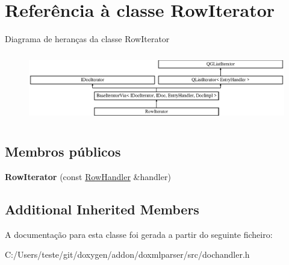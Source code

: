 \hypertarget{class_row_iterator}{\section{Referência à classe Row\-Iterator}
\label{class_row_iterator}
}
Diagrama de heranças da classe Row\-Iterator\begin{figure}[H]
\begin{center}
\leavevmode
\includegraphics[height=3.027027cm]{class_row_iterator}
\end{center}
\end{figure}
\subsection*{Membros públicos}
\begin{DoxyCompactItemize}
\item 
\hypertarget{class_row_iterator_a373e12ebf005676e91fda86deb4563da}{{\bfseries Row\-Iterator} (const \hyperlink{class_row_handler}{Row\-Handler} \&handler)}\label{class_row_iterator_a373e12ebf005676e91fda86deb4563da}

\end{DoxyCompactItemize}
\subsection*{Additional Inherited Members}


A documentação para esta classe foi gerada a partir do seguinte ficheiro\-:\begin{DoxyCompactItemize}
\item 
C\-:/\-Users/teste/git/doxygen/addon/doxmlparser/src/dochandler.\-h\end{DoxyCompactItemize}
